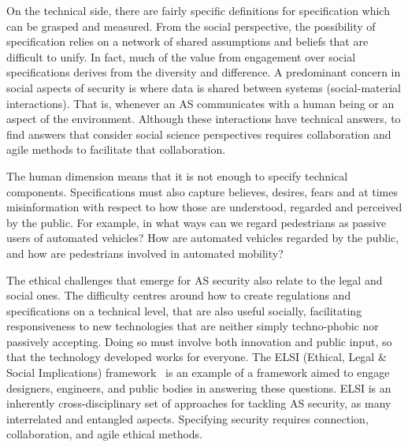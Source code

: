 \documentclass[sigconf,nonacm]{acmart}%
\begin{document}
	On the technical side, there are fairly specific definitions for specification which can be grasped and measured. From the social perspective, the possibility of specification relies on a network of shared assumptions and beliefs that are difficult to unify. In fact, much of the value from engagement over social specifications derives from the diversity and difference. 
	A predominant concern in social aspects of security is where data is shared between systems (social-material interactions).
	That is, whenever an AS communicates with a human being or an aspect of the environment. 
	Although these interactions have technical answers, to find answers that consider social science perspectives requires collaboration and agile methods to facilitate that collaboration.
	
	The human dimension means that it is not enough to specify technical components. Specifications must also capture believes, desires, fears and at times misinformation with respect to how those are understood, regarded and perceived by the public. For example, in what ways can we regard pedestrians as passive users of automated vehicles? How are automated vehicles regarded by the public, and how are pedestrians involved in automated mobility?
	
	The ethical challenges that emerge for AS security also relate to the legal and social ones. 
	The difficulty centres around how to create regulations and specifications on a technical level, that are also useful socially, facilitating responsiveness to new technologies that are neither simply techno-phobic nor passively accepting. 
	Doing so must involve both innovation and public input, so that the technology developed works for everyone. The ELSI (Ethical, Legal \& Social Implications) framework~\cite{Escalante2019} is an example of a framework aimed to engage designers, engineers, and public bodies in answering these questions. ELSI is an inherently cross-disciplinary set of approaches for tackling AS security, as many interrelated and entangled aspects. Specifying security requires connection, collaboration, and agile ethical methods.
	
\end{document}
